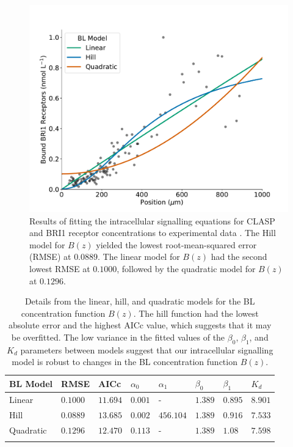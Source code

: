 \documentclass[referee,pdflatex,sn-mathphys-num]{sn-jnl}
\begin{document}
\begin{figure}
  \centering
  \includegraphics[width=\textwidth]{bes1-functions.pdf}
  \caption{Results of fitting the intracellular signalling equations for CLASP and BRI1 receptor concentrations to experimental data \cite{vukasinovic2021}.
  The Hill model for $B(z)$ yielded the lowest root-mean-squared error (RMSE) at $0.0889$.
The linear model for $B(z)$ had the second lowest RMSE at $0.1000$, followed by the quadratic model for $B(z)$ at $0.1296$.
 }
  \label{bl-functions}
\end{figure}

\begin{table}[ht]
\caption{Details from the linear, hill, and quadratic models for the BL concentration function $B(z)$.
The hill function had the lowest absolute error and the highest AICc value, which suggests that it may be overfitted.
The low variance in the fitted values of the $\beta_{0}$, $\beta_{1}$, and $K_{d}$ parameters between models suggest that our intracellular signalling model is robust to changes in the BL concentration function $B(z)$. }
\label{bl-fits}
\begin{tabular}{@{}llllllll@{}}
\toprule
BL Model & RMSE & AICc & $\alpha_{0}$ & $\alpha_{1}$ & $\beta_{0}$ & $\beta_{1}$ & $K_{d}$ \\
\midrule
Linear & $0.1000$ & $11.694$ & $0.001$ & - & $1.389$ & $0.895$ & $8.901$ \\
Hill & $0.0889$ & $13.685$ & $0.002$ & $456.104$ & $1.389$ & $0.916$ & $7.533$ \\
Quadratic & $0.1296$ & $12.470$ & $0.113$ & - & $1.389$ & $1.08$ & $7.598$ \\
\botrule
\end{tabular}
\end{table}
\end{document}
